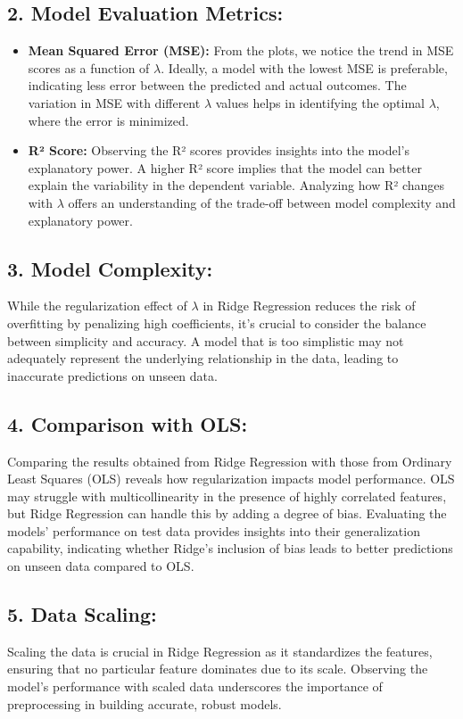 \documentclass{article}
\begin{document}
\subsection*{2. Model Evaluation Metrics:}
\begin{itemize}[label={--}]
    \item \textbf{Mean Squared Error (MSE):} From the plots, we notice the trend in MSE scores as a function of $\lambda$. Ideally, a model with the lowest MSE is preferable, indicating less error between the predicted and actual outcomes. The variation in MSE with different $\lambda$ values helps in identifying the optimal $\lambda$, where the error is minimized.
    \item \textbf{R² Score:} Observing the R² scores provides insights into the model's explanatory power. A higher R² score implies that the model can better explain the variability in the dependent variable. Analyzing how R² changes with $\lambda$ offers an understanding of the trade-off between model complexity and explanatory power.
\end{itemize}

\subsection*{3. Model Complexity:}
While the regularization effect of $\lambda$ in Ridge Regression reduces the risk of overfitting by penalizing high coefficients, it’s crucial to consider the balance between simplicity and accuracy. A model that is too simplistic may not adequately represent the underlying relationship in the data, leading to inaccurate predictions on unseen data.

\subsection*{4. Comparison with OLS:}
Comparing the results obtained from Ridge Regression with those from Ordinary Least Squares (OLS) reveals how regularization impacts model performance. OLS may struggle with multicollinearity in the presence of highly correlated features, but Ridge Regression can handle this by adding a degree of bias. Evaluating the models’ performance on test data provides insights into their generalization capability, indicating whether Ridge’s inclusion of bias leads to better predictions on unseen data compared to OLS.

\subsection*{5. Data Scaling:}
Scaling the data is crucial in Ridge Regression as it standardizes the features, ensuring that no particular feature dominates due to its scale. Observing the model’s performance with scaled data underscores the importance of preprocessing in building accurate, robust models.
\end{document}
